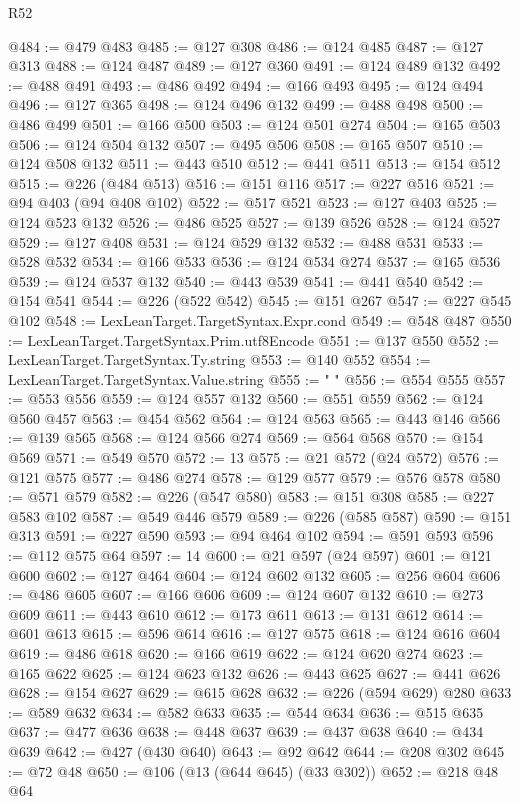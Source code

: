 \begin{lexlean}{R52}
\begin{coremodule}
@484 := @479 @483
@485 := @127 @308
@486 := @124 @485
@487 := @127 @313
@488 := @124 @487
@489 := @127 @360
@491 := @124 @489 @132
@492 := @488 @491
@493 := @486 @492
@494 := @166 @493
@495 := @124 @494
@496 := @127 @365
@498 := @124 @496 @132
@499 := @488 @498
@500 := @486 @499
@501 := @166 @500
@503 := @124 @501 @274
@504 := @165 @503
@506 := @124 @504 @132
@507 := @495 @506
@508 := @165 @507
@510 := @124 @508 @132
@511 := @443 @510
@512 := @441 @511
@513 := @154 @512
@515 := @226 (@484 @513)
@516 := @151 @116
@517 := @227 @516
@521 := @94 @403 (@94 @408 @102)
@522 := @517 @521
@523 := @127 @403
@525 := @124 @523 @132
@526 := @486 @525
@527 := @139 @526
@528 := @124 @527
@529 := @127 @408
@531 := @124 @529 @132
@532 := @488 @531
@533 := @528 @532
@534 := @166 @533
@536 := @124 @534 @274
@537 := @165 @536
@539 := @124 @537 @132
@540 := @443 @539
@541 := @441 @540
@542 := @154 @541
@544 := @226 (@522 @542)
@545 := @151 @267
@547 := @227 @545 @102
@548 := LexLeanTarget.TargetSyntax.Expr.cond
@549 := @548 @487
@550 := LexLeanTarget.TargetSyntax.Prim.utf8Encode
@551 := @137 @550
@552 := LexLeanTarget.TargetSyntax.Ty.string
@553 := @140 @552
@554 := LexLeanTarget.TargetSyntax.Value.string
@555 := " "
@556 := @554 @555
@557 := @553 @556
@559 := @124 @557 @132
@560 := @551 @559
@562 := @124 @560 @457
@563 := @454 @562
@564 := @124 @563
@565 := @443 @146
@566 := @139 @565
@568 := @124 @566 @274
@569 := @564 @568
@570 := @154 @569
@571 := @549 @570
@572 := 13
@575 := @21 @572 (@24 @572)
@576 := @121 @575
@577 := @486 @274
@578 := @129 @577
@579 := @576 @578
@580 := @571 @579
@582 := @226 (@547 @580)
@583 := @151 @308
@585 := @227 @583 @102
@587 := @549 @446 @579
@589 := @226 (@585 @587)
@590 := @151 @313
@591 := @227 @590
@593 := @94 @464 @102
@594 := @591 @593
@596 := @112 @575 @64
@597 := 14
@600 := @21 @597 (@24 @597)
@601 := @121 @600
@602 := @127 @464
@604 := @124 @602 @132
@605 := @256 @604
@606 := @486 @605
@607 := @166 @606
@609 := @124 @607 @132
@610 := @273 @609
@611 := @443 @610
@612 := @173 @611
@613 := @131 @612
@614 := @601 @613
@615 := @596 @614
@616 := @127 @575
@618 := @124 @616 @604
@619 := @486 @618
@620 := @166 @619
@622 := @124 @620 @274
@623 := @165 @622
@625 := @124 @623 @132
@626 := @443 @625
@627 := @441 @626
@628 := @154 @627
@629 := @615 @628
@632 := @226 (@594 @629) @280
@633 := @589 @632
@634 := @582 @633
@635 := @544 @634
@636 := @515 @635
@637 := @477 @636
@638 := @448 @637
@639 := @437 @638
@640 := @434 @639
@642 := @427 (@430 @640)
@643 := @92 @642
@644 := @208 @302
@645 := @72 @48
@650 := @106 (@13 (@644 @645) (@33 @302))
@652 := @218 @48 @64

\end{coremodule}
\end{lexlean}
